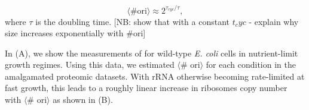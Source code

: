 \begin{equation}
    \langle \text{\# ori} \rangle \approx 2^{\tau_{cyc} / \tau},
    \label{eq:Nori}
\end{equation}
where $\tau$ is the doubling time.
[NB: show that with a constant $t_cyc$ - explain why size increases exponentially with #ori]

In (A), we show the measurements of \cite{si2017}
for wild-type \textit{E. coli} cells in nutrient-limit growth regimes. Using
this data, we estimated $\langle$\# ori$\rangle$ for each condition in the
amalgamated proteomic datasets. With rRNA otherwise becoming rate-limited at
fast growth, this leads to a roughly linear increase in ribosomes copy number
with $\langle$\# ori$\rangle$ as shown in (B).








